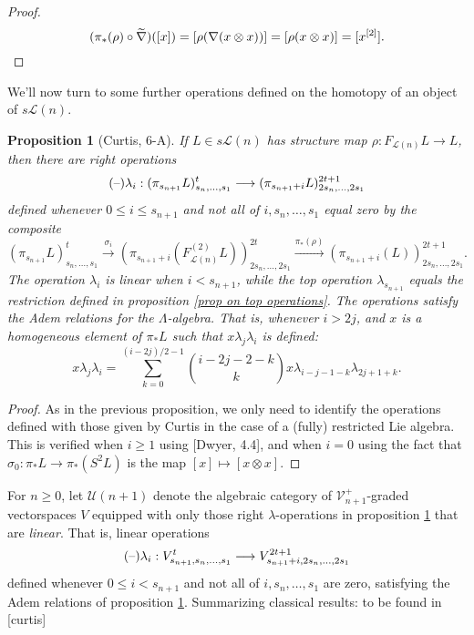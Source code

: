 \documentclass[11pt]{amsart}
\theoremstyle{plain}
\newtheorem{prop}[thm]{Proposition}
\theoremstyle{definition}
\newcommand{\DASH}{\textup{--}}
\renewcommand{\to}{\longrightarrow}
\newcommand{\calU}{\mathcal{U}}
\newcommand{\calL}{\mathcal{L}}
\newcommand{\calV}{\mathcal{V}}
\theoremstyle{plain}
\newcommand{\restn}[1]{#1^{[2]}}
\newcommand{\vect}[2]{\calV^{#1}_{#2}}
\begin{document}
\begin{Lie algebras in characteristic 2 and their homotopy operations}
\begin{proof}
\[(\pi_*(\rho)\circ\widetilde{\nabla})([x])=[\rho(\nabla(x\otimes x))]=[\rho(x\otimes x)]=[\restn{x}].\qedhere\]
\end{proof}
We'll now turn to some further operations defined on the homotopy of an object of $s\calL(n)$.
\begin{prop}[Curtis, 6-A]\label{linear operations on homotopy of lie alg}
If $L\in s\calL(n)$ has structure map $\rho:F_{\calL(n)}L\to L$, then there are right operations
\[(\DASH)\lambda_i:(\pi_{s_{n+1}}L)_{s_n,\ldots,s_1}^t\to (\pi_{s_{n+1}+i}L)_{2s_n,\ldots,2s_1}^{2t+1}\]
defined whenever $0\leq i\leq s_{n+1}$ and not all of $i,s_n,\ldots,s_1$ equal zero by the composite
\[(\pi_{s_{n+1}}L)_{s_n,\ldots,s_1}^t\overset{\sigma_i}{\to}(\pi_{s_{n+1}+i}(F^{(2)}_{\calL(n)}L))_{2s_n,\ldots,2s_1}^{2t}\overset{\pi_*(\rho)}{\to}(\pi_{s_{n+1}+i}(L))_{2s_n,\ldots,2s_1}^{2t+1}.\]
The operation $\lambda_i$ is linear when $i<s_{n+1}$, while the top operation $\lambda_{s_{n+1}}$ equals the restriction defined in proposition \ref{prop on top operations}. The operations satisfy the Adem relations for the $\Lambda$-algebra. That is, whenever $i>2j$, and $x$ is a homogeneous element of $\pi_*L$ such that $x\lambda_j\lambda_i$ is defined:
\[x\lambda_j\lambda_i=\sum_{k=0}^{(i-2j)/2-1}{i-2j-2-k\choose k}x\lambda_{i-j-1-k}\lambda_{2j+1+k}.\]
\end{prop}
\begin{proof}
As in the previous proposition, we only need to identify the operations defined with those given by Curtis in the case of a (fully) restricted Lie algebra. This is verified when $i\geq1$ using [Dwyer, 4.4], and when $i=0$ using the fact that $\sigma_0:\pi_*L\to \pi_*(S^2L)$ is the map $[x]\mapsto[x\otimes x]$.
\end{proof}
For $n\geq0$, let $\calU(n+1)$ denote the algebraic category of $\vect{+}{n+1}$-graded vectorspaces $V$ equipped with only those right $\lambda$-operations in proposition \ref{linear operations on homotopy of lie alg} that are \emph{linear}. That is, linear operations 
\[(\DASH)\lambda_i:V_{s_{n+1},s_n,\ldots,s_1}^t\to V_{s_{n+1}+i,2s_n,\ldots,2s_1}^{2t+1}\]
defined whenever $0\leq i< s_{n+1}$ and not all of $i,s_{n},\ldots,s_{1}$ are zero, satisfying the Adem relations of proposition \ref{linear operations on homotopy of lie alg}. Summarizing classical results: to be found in [curtis]


\end{Lie algebras in characteristic 2 and their homotopy operations}
\end{document}
